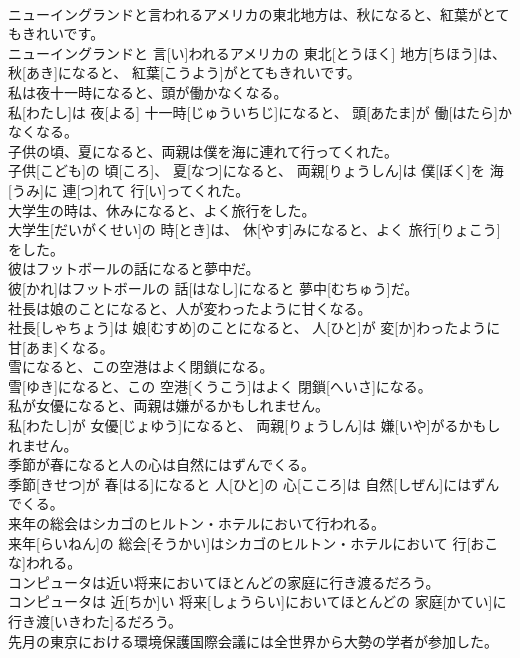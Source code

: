 \documentclass[8pt]{extreport}
\begin{document}
\begin{CJK}{UTF8}{min}
\\	ニューイングランドと言われるアメリカの東北地方は、秋になると、紅葉がとてもきれいです。	
\\	ニューイングランドと 言[い]われるアメリカの 東北[とうほく] 地方[ちほう]は、 秋[あき]になると、 紅葉[こうよう]がとてもきれいです。
\\	私は夜十一時になると、頭が働かなくなる。	
\\	私[わたし]は 夜[よる] 十一時[じゅういちじ]になると、 頭[あたま]が 働[はたら]かなくなる。
\\	子供の頃、夏になると、両親は僕を海に連れて行ってくれた。	
\\	子供[こども]の 頃[ころ]、 夏[なつ]になると、 両親[りょうしん]は 僕[ぼく]を 海[うみ]に 連[つ]れて 行[い]ってくれた。
\\	大学生の時は、休みになると、よく旅行をした。	
\\	大学生[だいがくせい]の 時[とき]は、 休[やす]みになると、よく 旅行[りょこう]をした。
\\	彼はフットボールの話になると夢中だ。	
\\	彼[かれ]はフットボールの 話[はなし]になると 夢中[むちゅう]だ。
\\	社長は娘のことになると、人が変わったように甘くなる。	
\\	社長[しゃちょう]は 娘[むすめ]のことになると、 人[ひと]が 変[か]わったように 甘[あま]くなる。
\\	雪になると、この空港はよく閉鎖になる。	
\\	雪[ゆき]になると、この 空港[くうこう]はよく 閉鎖[へいさ]になる。
\\	私が女優になると、両親は嫌がるかもしれません。	
\\	私[わたし]が 女優[じょゆう]になると、 両親[りょうしん]は 嫌[いや]がるかもしれません。
\\	季節が春になると人の心は自然にはずんでくる。	
\\	季節[きせつ]が 春[はる]になると 人[ひと]の 心[こころ]は 自然[しぜん]にはずんでくる。
\\	来年の総会はシカゴのヒルトン・ホテルにおいて行われる。	
\\	来年[らいねん]の 総会[そうかい]はシカゴのヒルトン・ホテルにおいて 行[おこな]われる。
\\	コンピュータは近い将来においてほとんどの家庭に行き渡るだろう。	
\\	コンピュータは 近[ちか]い 将来[しょうらい]においてほとんどの 家庭[かてい]に 行き渡[いきわた]るだろう。
\\	先月の東京における環境保護国際会議には全世界から大勢の学者が参加した。	

\end{CJK}
\end{document}
